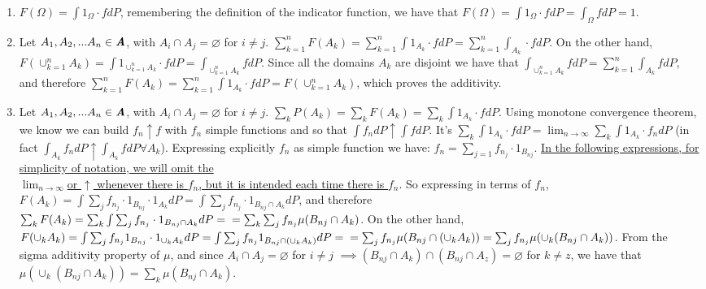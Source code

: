 \documentclass[12pt,mythesisstyle]{report}
\begin{document}
\begin{enumerate}
\item $F(\Omega)=\int 1_\Omega\cdot fdP$, remembering the definition of the indicator function, we have that $F(\Omega)=\int 1_\Omega\cdot fdP=\int_\Omega fdP=1$.\\
\item Let $A_1, A_2,...A_n\in\textbf{\textit{A}}$, with $A_i\cap A_j=\varnothing$ for $i\neq j$. $\sum_{k=1}^n F(A_k)=\sum_{k=1}^n\int 1_{A_k}\cdot fdP=\sum_{k=1}^n\int_{A_k}\cdot fdP$. On the other hand, $F(\cup_{k=1}^n A_k)=\int 1_{\cup_{k=1}^n A_k}\cdot fdP=\int_{\cup_{k=1}^n A_k}fdP$. Since all the domains $A_k$ are disjoint we have that $\int_{\cup_{k=1}^n A_k}fdP=\sum_{k=1}^n \int_{A_k}fdP$, and therefore $\sum_{k=1}^n F(A_k)=\sum_{k=1}^n\int 1_{A_k}\cdot fdP=F(\cup_{k=1}^n A_k)$, which proves the additivity.\\
\item Let $A_1, A_2,...A_n\in\textbf{\textit{A}}$, with $A_i\cap A_j=\varnothing$ for $i\neq j$. $\sum_{k}P(A_k)=\sum_{k}F(A_k)=\sum_{k}\int 1_{A_k}\cdot fdP$. Using monotone convergence theorem, we know we can build $f_n\uparrow f$ with $f_n$ simple functions and so that $\int f_n dP\uparrow \int fdP$. It's $\displaystyle{\sum_{k}\int 1_{A_k}\cdot fdP=\lim_{n \to \infty}\sum_{k}\int 1_{A_k}\cdot f_ndP}$ (in fact $\int_{A_k} f_ndP\uparrow\int_{A_k} fdP \forall A_k$). Expressing explicitly $f_n$ as simple function we have: $f_n=\sum_{j=1}f_{n_j}\cdot 1_{B_{nj}}$. \underline{In the following expressions, for simplicity of notation, we will omit the}\\\underline{$\lim_{n \to \infty}$}\underline{or $\uparrow$ whenever there is $f_n$, but it is intended each time there is $f_n$}. So expressing in terms of $f_n$, $F(A_k)=\int\sum_j f_{n_j}\cdot 1_{B_{nj}}\cdot 1_{A_k}dP=\int\sum_j f_{n_j}\cdot 1_{B_{nj} \cap {A_k}}dP$, and therefore $\sum_k F(A_k)=\sum_k \int\sum_j f_{n_j}\cdot 1_{B_{nj} \cap {A_k}}dP=\\=\sum_k\sum_j f_{n_j}\mu(B_{nj} \cap {A_k})$. On the other hand,\\$F(\cup_k A_k)=\int \sum_j f_{n_j}1_{B_{nj}} \cdot 1_{\cup _k {A_k}}dP=\int \sum_j f_{n_j}1_{B_{nj}\cap (\cup _k {A_k})}dP=\\=\sum_j f_{n_j}\mu({B_{nj}\cap (\cup _k {A_k})})=\sum_j f_{n_j}\mu(\cup_k({B_{nj}\cap {A_k}}))$. From the sigma additivity property of $\mu$, and since $A_i\cap A_j=\varnothing$ for $i\neq j$ $\implies ({B_{nj}\cap {A_k}})\cap({B_{nj}\cap {A_z}})=\varnothing$ for $k\neq z$, we have that $\mu(\cup_k({B_{nj}\cap {A_k}}))=\sum_k\mu({B_{nj}\cap {A_k}})$.\\

\end{enumerate}
\end{document}
